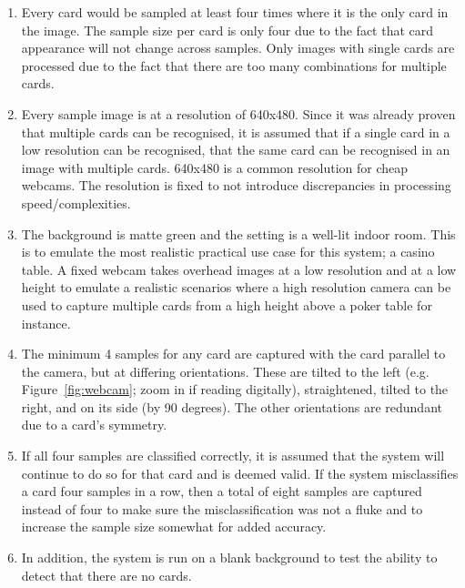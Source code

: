 \documentclass[a4paper,12pt,notitlepage]{article}
\begin{document}
	\begin{enumerate}
		\item Every card would be sampled at least four times where it is the only card in the image. The sample size per card is only four due to the fact that card appearance will not change across samples. Only images with single cards are processed due to the fact that there are too many combinations for multiple cards.
		\item Every sample image is at a resolution of 640x480. Since it was already proven that multiple cards can be recognised, it is assumed that if a single card in a low resolution can be recognised, that the same card can be recognised in an image with multiple cards. 640x480 is a common resolution for cheap webcams. The resolution is fixed to not introduce discrepancies in processing speed/complexities.
		\item The background is matte green and the setting is a well-lit indoor room. This is to emulate the most realistic practical use case for this system; a casino table. A fixed webcam takes overhead images at a low resolution and at a low height to emulate a realistic scenarios where a high resolution camera can be used to capture multiple cards from a high height above a poker table for instance.
		\item The minimum 4 samples for any card are captured with the card parallel to the camera, but at differing orientations. These are tilted to the left (e.g. Figure~\ref{fig:webcam}; zoom in if reading digitally), straightened, tilted to the right, and on its side (by 90 degrees). The other orientations are redundant due to a card's symmetry.
		\item If all four samples are classified correctly, it is assumed that the system will continue to do so for that card and is deemed valid. If the system misclassifies a card four samples in a row, then a total of eight samples are captured instead of four to make sure the misclassification was not a fluke and to increase the sample size somewhat for added accuracy.
		\item In addition, the system is run on a blank background to test the ability to detect that there are no cards.
	\end{enumerate}
\end{document}
